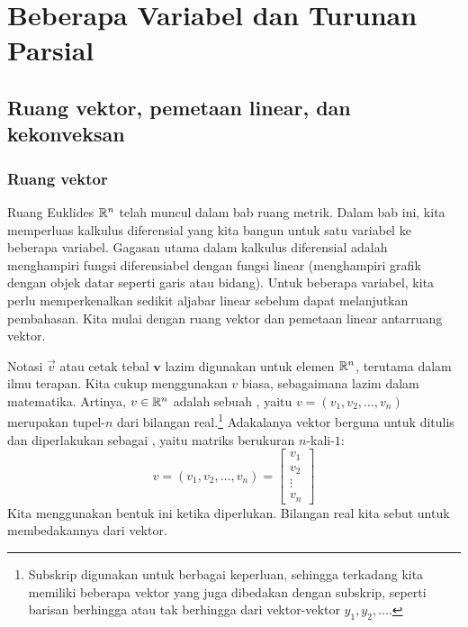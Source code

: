 \chapter{Beberapa Variabel dan Turunan Parsial} \label{pd:chapter}


\section{Ruang vektor, pemetaan linear, dan kekonveksan}
\label{sec:vectorspaces}



\subsection{Ruang vektor}

Ruang Euklides ${\mathbb{R}}^n$ telah muncul dalam bab ruang metrik.
Dalam bab ini, kita memperluas kalkulus diferensial yang kita bangun
untuk satu variabel ke beberapa variabel.  Gagasan utama dalam
kalkulus diferensial adalah menghampiri fungsi diferensiabel dengan fungsi
linear
(menghampiri grafik dengan objek datar seperti garis atau bidang).
Untuk beberapa variabel, kita perlu memperkenalkan sedikit aljabar
linear sebelum dapat melanjutkan pembahasan.
Kita mulai dengan ruang vektor dan pemetaan linear antarruang vektor.

Notasi $\vec{v}$ atau cetak tebal
$\mathbf{v}$ lazim digunakan untuk elemen ${\mathbb{R}}^n$,
terutama dalam ilmu terapan.
Kita cukup menggunakan $v$ biasa, sebagaimana lazim dalam matematika.
Artinya, $v \in {\mathbb{R}}^n$ adalah sebuah \emph{}, yaitu
$v = (v_1,v_2,\ldots,v_n)$ merupakan tupel-$n$ dari
bilangan real.\footnote{Subskrip digunakan untuk berbagai keperluan,
sehingga terkadang kita memiliki beberapa vektor yang juga
dibedakan dengan subskrip, seperti barisan berhingga atau tak berhingga dari
vektor-vektor $y_1,y_2,\ldots$.}
Adakalanya vektor berguna untuk ditulis dan diperlakukan sebagai
\emph{}, yaitu matriks berukuran $n$-kali-$1$:
\begin{equation*}
v =
(v_1,v_2,\ldots,v_n) =
{ \left[
\begin{smallmatrix}
v_1 \\ v_2 \\ \vdots \\ v_n
\end{smallmatrix}
\right]
}
\end{equation*}
Kita menggunakan bentuk ini ketika diperlukan.
Bilangan real kita sebut
\emph{} untuk membedakannya dari vektor.


